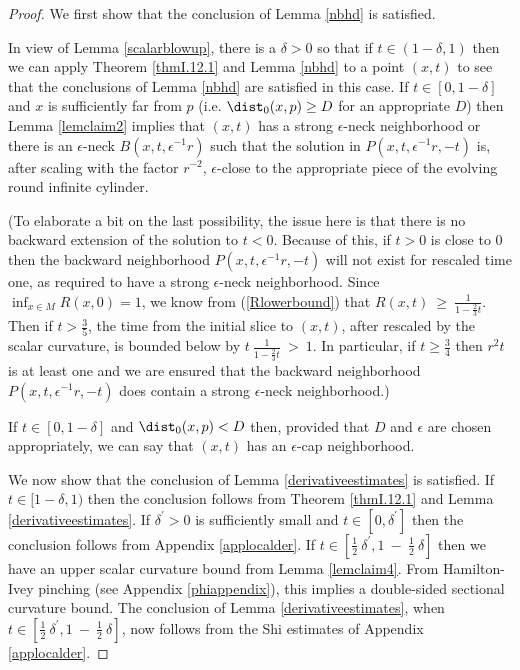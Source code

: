 \begin{proof}
We first show that the conclusion of Lemma \ref{nbhd} is satisfied.

In view of Lemma \ref{scalarblowup}, there is a $\delta > 0$ so that
if $t \in (1-\delta, 1)$ then
we can apply Theorem \ref{thmI.12.1}
and Lemma \ref{nbhd} to a point $(x,t)$ to see that the conclusions
of Lemma \ref{nbhd} are satisfied in this case.
If $t \in [0, 1-\delta]$ and $x$ is sufficiently far from $p$
(i.e. $\dist_0(x,p) \ge D$ for an appropriate $D$) then Lemma \ref{lemclaim2} implies
that $(x,t)$ has a strong $\epsilon$-neck neighborhood or
there is an $\epsilon$-neck $B(x,t,\epsilon^{-1} r)$
such that the solution in $P(x,t,\epsilon^{-1}r, -t)$ is, after
scaling with the factor $r^{-2}$, $\epsilon$-close to the appropriate
piece of the evolving round infinite cylinder.

(To elaborate a bit on the last possibility,
the issue here is that
there is no backward extension of the solution to $t<0$.
Because of this, if $t >0$ is close to $0$ then the backward
neighborhood
$P(x,t,\epsilon^{-1}r, -t)$ will not exist for rescaled time one,
as required to have a strong $\epsilon$-neck neighborhood.
Since $\inf_{x \in M} R(x,0) = 1$, we know from
(\ref{Rlowerbound}) that
$R(x,t) \: \ge \: \frac{1}{1- \frac23 t}$.
Then if $t > \frac35$, the time from the initial
slice to $(x,t)$, after rescaled by the scalar curvature, is bounded below by
$t \: \frac{1}{1- \frac23 t} \: > \: 1$. In particular,
if $t \ge \frac34$ then $r^2 t$ is at least one and
we are ensured that
the backward neighborhood
$P(x,t,\epsilon^{-1}r, -t)$ does contain a strong
$\epsilon$-neck neighborhood.)

If $t \in [0, 1-\delta]$ and
$\dist_0(x,p) < D$ then,  provided that
$D$ and $\epsilon$ are chosen appropriately, we can say that
$(x,t)$ has an $\epsilon$-cap neighborhood.

We now show that the conclusion of
Lemma \ref{derivativeestimates} is satisfied.
If $t \in [1-\delta, 1)$ then the conclusion follows from
Theorem \ref{thmI.12.1} and Lemma \ref{derivativeestimates}.
If $\delta^\prime > 0$ is sufficiently
small and $t \in [0, \delta^\prime]$ then the conclusion follows from Appendix
\ref{applocalder}. If $t \in [\frac12 \: \delta^\prime,
1 \: - \: \frac12 \: \delta]$
then we have an upper scalar curvature bound from Lemma \ref{lemclaim4}.
From Hamilton-Ivey pinching (see Appendix \ref{phiappendix}), this implies
a double-sided sectional curvature bound.
The conclusion of Lemma \ref{derivativeestimates},
when $t \in [\frac12 \: \delta^\prime,
1 \: - \: \frac12 \: \delta]$, now follows from
the Shi estimates of Appendix \ref{applocalder}.


\end{proof}
